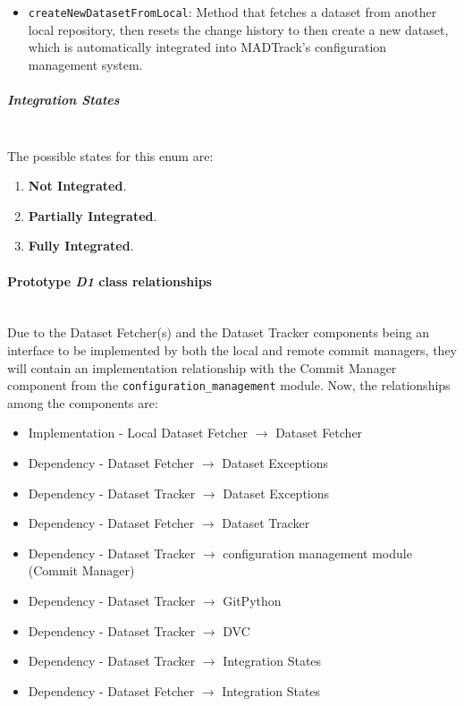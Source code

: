 \begin{itemize}
    \item \texttt{createNewDatasetFromLocal}: Method that fetches a dataset from another local repository, then resets the change history to then create a new dataset, 
    which is automatically integrated into MADTrack's configuration management system.
\end{itemize}

\subparagraph{Integration States}\mbox{}\\

The possible states for this enum are:

\begin{enumerate}
    \item \textbf{Not Integrated}.
    \item \textbf{Partially Integrated}.
    \item \textbf{Fully Integrated}.
\end{enumerate}

\paragraph{Prototype \emph{D1} class relationships}\mbox{}\\

Due to the Dataset Fetcher(s) and the Dataset Tracker components being an interface to be implemented by both the local and remote commit managers, they will contain 
an implementation relationship with the Commit Manager component from the \texttt{configuration\_management} module. Now, the relationships among the components are:

\begin{itemize}
    \item Implementation - Local Dataset Fetcher $\rightarrow$ Dataset Fetcher
    \item Dependency - Dataset Fetcher $\rightarrow$ Dataset Exceptions
    \item Dependency - Dataset Tracker $\rightarrow$ Dataset Exceptions
    \item Dependency - Dataset Fetcher $\rightarrow$ Dataset Tracker
    \item Dependency - Dataset Tracker $\rightarrow$ configuration management module (Commit Manager)
    \item Dependency - Dataset Tracker $\rightarrow$ GitPython
    \item Dependency - Dataset Tracker $\rightarrow$ DVC
    \item Dependency - Dataset Tracker $\rightarrow$ Integration States
    \item Dependency - Dataset Fetcher $\rightarrow$ Integration States
\end{itemize}

